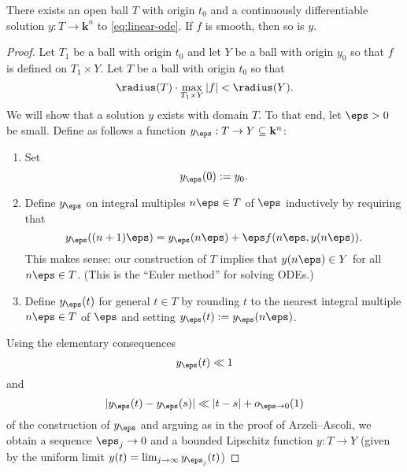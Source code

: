 \documentclass[reqno]{amsart} 
\begin{document}
\begin{theorem}[Existence]\label{thm:existence}
  There exists an open ball $T$ with origin $t_0$ and a continuously
  differentiable solution $y : T \rightarrow \mathbf{k}^n$ to
  \eqref{eq:linear-ode}.  If $f$ is smooth, then so is $y$.
\end{theorem}
\begin{proof}
  Let $T_1$ be a ball with origin $t_0$
  and let $Y$ be a ball with origin $y_0$
  so that $f$ is defined on
  $T_1 \times Y$.
  Let $T$ be a ball with origin $t_0$
  so that
  \begin{equation*}
  \radius(T) \cdot \max_{T_1 \times Y} |f| < \radius(Y).
  \end{equation*}
  We will show that a solution $y$ exists with domain $T$.  To
  that end, let $\eps > 0$ be small.  Define as follows a
  function $y_\eps : T \rightarrow Y \subseteq \mathbf{k}^n$:
  \begin{enumerate}
  \item Set
    \begin{equation}\label{eq:diff-eqn-euler-initial-cond}
      y_\eps(0) := y_0.
    \end{equation}
  \item Define $y_\eps$ on integral multiples $n \eps \in T$ of
    $\eps$ 
    inductively
    by requiring that
    \begin{equation}\label{eq:diff-eqn-euler-initial-step}
    y_\eps((n+1) \eps)
    = y_\eps(n \eps) + \eps f(n \eps, y(n \eps)).
  \end{equation}
  This makes sense: our construction of $T$
    implies that $y(n \eps) \in Y$ for all $n \eps \in T$.
    (This is the ``Euler method'' for solving ODEs.)
  \item
    Define $y_\eps(t)$ for general $t \in T$
    by rounding $t$ to the nearest integral multiple
    $n \eps \in T$ of $\eps$
    and setting $y_\eps(t) := y_\eps(n \eps)$.
  \end{enumerate}
  Using the elementary consequences
  \begin{equation*}
  y_\eps(t) \ll 1
  \end{equation*}
  and
  \begin{equation*}
  |y_\eps(t) - y_\eps(s)| \ll |t - s| + o_{\eps \rightarrow 0}(1)
  \end{equation*}
  of the construction of $y_\eps$
  and arguing as in the proof of Arzeli--Ascoli,
  we obtain a
  sequence $\eps_j \rightarrow 0$
  and a
  bounded Lipschitz function $y : T \rightarrow Y$
  (given by the uniform limit $y(t) = \lim_{j \rightarrow \infty} y_{\eps_j}(t)$)

\end{proof}
\end{document}
